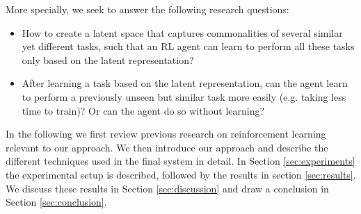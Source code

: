 More specially, we seek to answer the following research questions:
\begin{itemize}
	\item How to create a latent space that captures commonalities of several similar yet different tasks, such that an RL agent can learn to perform all these tasks only based on the latent representation?
	\item After learning a task based on the latent representation, can the agent learn to perform a previously unseen but similar task more easily (e.g. taking less time to train)? Or can the agent do so without learning?
\end{itemize}

In the following we first review previous research on reinforcement learning relevant to our approach. We then introduce our approach and describe the different techniques used in the final system in detail. In Section \ref{sec:experiments} the experimental setup is described, followed by the results in section \ref{sec:results}. We discuss these results in Section \ref{sec:discussion} and draw a conclusion in Section \ref{sec:conclusion}.